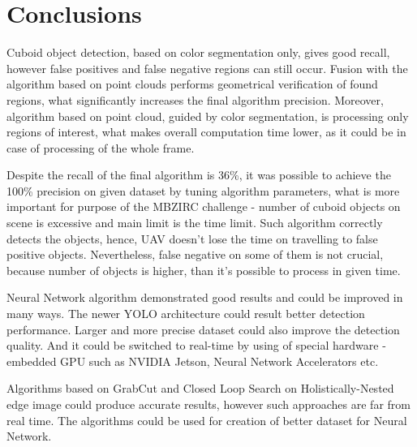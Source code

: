 \documentclass{ctuthesis}
\begin{document}
\chapter{Conclusions}
Cuboid object detection, based on color segmentation only, gives good recall, however false positives and false negative regions can still occur. Fusion with the algorithm based on point clouds performs geometrical verification of found regions, what significantly increases the final algorithm precision. Moreover, algorithm based on point cloud, guided by color segmentation, is processing only regions of interest, what makes overall computation time lower, as it could be in case of processing of the whole frame. 

Despite the recall of the final algorithm is 36\%, it was possible to achieve the 100\% precision on given dataset by tuning algorithm parameters, what is more important for purpose of the MBZIRC challenge - number of cuboid objects on scene is excessive and main limit is the time limit. Such algorithm correctly detects the objects, hence, UAV doesn't lose the time on travelling to false positive objects. Nevertheless, false negative on some of them is not crucial, because number of objects is higher, than it's possible to process in given time.

Neural Network algorithm demonstrated good results and could be improved in many ways. The newer YOLO architecture could result better detection performance. Larger and more precise dataset could also improve the detection quality. And it could be switched to real-time by using of special hardware - embedded GPU such as NVIDIA Jetson, Neural Network Accelerators etc.

Algorithms based on GrabCut and Closed Loop Search on Holistically-Nested edge image could produce accurate results, however such approaches are far from real time. The algorithms could be used for creation of better dataset for Neural Network.
\end{document}
